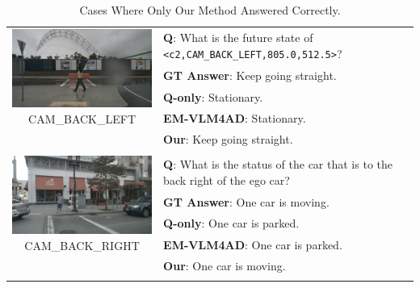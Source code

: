 \documentclass{article} %
\begin{document}
\begin{table}[htbp]
\begin{tabular}{cp{9cm}}
\multirow{4}{*}{\parbox{6cm}{
    \centering
    \includegraphics[width=6cm]{Figures/n008-2018-09-18-13-41-50-0400__CAM_BACK_LEFT__1537293297797405.jpg}\\
    {\tiny CAM\_BACK\_LEFT}
}}
& \textbf{Q}: What is the future state of \texttt{<c2,CAM\_BACK\_LEFT,805.0,512.5>}? \\
& \textbf{GT Answer}: Keep going straight. \\
& \textbf{Q-only}: Stationary. \\
& \textbf{EM-VLM4AD}: Stationary. \\ 
& \textbf{Our}: Keep going straight. \\
\vspace{2em} & \vspace{2em} \\

\multirow{4}{*}{\parbox{6cm}{
    \centering
    \includegraphics[width=6cm]{Figures/n008-2018-08-29-16-04-13-0400__CAM_BACK_RIGHT__1535573956528113.jpg}\\
    {\tiny CAM\_BACK\_RIGHT}
}}
& \textbf{Q}: What is the status of the car that is to the back right of the ego car? \\
& \textbf{GT Answer}: One car is moving. \\
& \textbf{Q-only}: One car is parked. \\
& \textbf{EM-VLM4AD}: One car is parked. \\ 
& \textbf{Our}: One car is moving. \\
\vspace{2em} & \vspace{2em} \\
\end{tabular}
    \caption{Cases Where Only Our Method Answered Correctly.}
    \label{tab:qualitative_examples_our}
\end{table}
\end{document}
